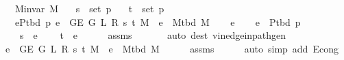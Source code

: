 \begin{isabellebody}
\ \ \ {\isachardoublequoteopen}M{\isachardot}{\kern0pt}invar\ M{\isachardoublequoteclose}\isanewline
\ \ \ {\isachardoublequoteopen}s\ {\isasymnotin}\ set\ p{\isachardoublequoteclose}\isanewline
\ \ \ {\isachardoublequoteopen}t\ {\isasymnotin}\ set\ p{\isachardoublequoteclose}\isanewline
\ \ \ {\isachardoublequoteopen}{\isasymforall}e{\isasymin}P{\isacharunderscore}{\kern0pt}tbd\ p{\isachardot}{\kern0pt}\ e\ {\isasymin}\ G{\isachardot}{\kern0pt}E\ {\isacharparenleft}{\kern0pt}G{}\ L\ R\ s\ t\ M{\isacharparenright}{\kern0pt}\ {\isasymlongleftrightarrow}\ e\ {\isasymin}\ M{\isacharunderscore}{\kern0pt}tbd\ M{\isachardoublequoteclose}%
\endisataginvisible
{\isafoldinvisible}%
%
\isadeliminvisible
\isanewline
%
\endisadeliminvisible
%
\isadelimproof
%
\endisadelimproof
%
\isatagproof
{}\isamarkupfalse%
\isanewline
\ \ \isamarkupfalse%
\ e\isanewline
\ \ \isamarkupfalse%
\ {\isachardoublequoteopen}e\ {\isasymin}\ P{\isacharunderscore}{\kern0pt}tbd\ p{\isachardoublequoteclose}\isanewline
\ \ \isamarkupfalse%
\isanewline
\ \ \ \ {\isachardoublequoteopen}s\ {\isasymnotin}\ e{\isachardoublequoteclose}\isanewline
\ \ \ \ {\isachardoublequoteopen}t\ {\isasymnotin}\ e{\isachardoublequoteclose}\isanewline
\ \ \ \ \isamarkupfalse%
\ assms{\isacharparenleft}{\kern0pt}{}{\isacharcomma}{\kern0pt}\ {}{\isacharparenright}{\kern0pt}\isanewline
\ \ \ \ \isamarkupfalse%
\ {\isacharparenleft}{\kern0pt}auto\ dest{\isacharcolon}{\kern0pt}\ v{\isacharunderscore}{\kern0pt}in{\isacharunderscore}{\kern0pt}edge{\isacharunderscore}{\kern0pt}in{\isacharunderscore}{\kern0pt}path{\isacharunderscore}{\kern0pt}gen{\isacharparenright}{\kern0pt}\isanewline
\ \ \isamarkupfalse%
\ {\isachardoublequoteopen}e\ {\isasymin}\ G{\isachardot}{\kern0pt}E\ {\isacharparenleft}{\kern0pt}G{}\ L\ R\ s\ t\ M{\isacharparenright}{\kern0pt}\ {\isasymlongleftrightarrow}\ e\ {\isasymin}\ M{\isacharunderscore}{\kern0pt}tbd\ M{\isachardoublequoteclose}\isanewline
\ \ \ \ \isamarkupfalse%
\ assms{\isacharparenleft}{\kern0pt}{}{\isacharparenright}{\kern0pt}\isanewline
\ \ \ \ \isamarkupfalse%
\ {\isacharparenleft}{\kern0pt}auto\ simp\ add{\isacharcolon}{\kern0pt}\ E{}{\isacharunderscore}{\kern0pt}cong{\isacharparenright}{\kern0pt}\isanewline
{}\isamarkupfalse%
%
\endisatagproof
{\isafoldproof}%
%
\isadelimproof

\end{isabellebody}

